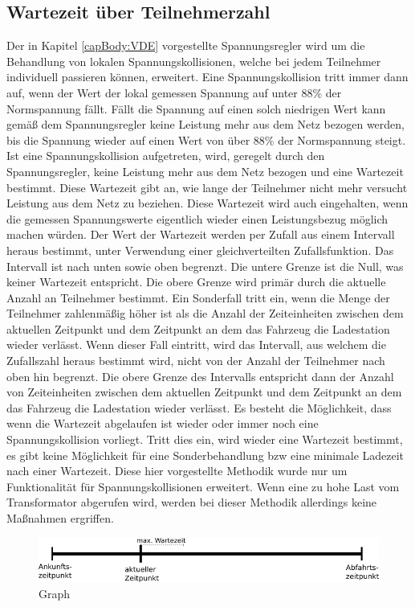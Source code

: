 \subsection{Wartezeit über Teilnehmerzahl}
\label{cap:background_sec:SA_participants}
Der in Kapitel \ref{capBody:VDE} vorgestellte Spannungsregler wird um die Behandlung von lokalen Spannungskollisionen, welche bei jedem Teilnehmer individuell passieren können, erweitert. Eine Spannungskollision tritt immer dann auf, wenn der Wert der lokal gemessen Spannung auf unter 88\% der Normspannung fällt. Fällt die Spannung auf einen solch niedrigen Wert kann gemäß dem Spannungsregler keine Leistung mehr aus dem Netz bezogen werden, bis die Spannung wieder auf einen Wert von über 88\% der Normspannung steigt. Ist eine Spannungskollision aufgetreten, wird, geregelt durch den Spannungsregler, keine Leistung mehr aus dem Netz bezogen und eine Wartezeit bestimmt. Diese Wartezeit gibt an, wie lange der Teilnehmer nicht mehr versucht Leistung aus dem Netz zu beziehen. Diese Wartezeit wird auch eingehalten, wenn die gemessen Spannungswerte eigentlich wieder einen Leistungsbezug möglich machen würden. Der Wert der Wartezeit werden per Zufall aus einem Intervall heraus bestimmt, unter Verwendung einer gleichverteilten Zufallsfunktion. Das Intervall ist nach unten sowie oben begrenzt. Die untere Grenze ist die Null, was keiner Wartezeit entspricht. Die obere Grenze wird primär durch die aktuelle Anzahl an Teilnehmer bestimmt. Ein Sonderfall tritt ein, wenn die Menge der Teilnehmer zahlenmäßig höher ist als die Anzahl der Zeiteinheiten zwischen dem aktuellen Zeitpunkt und dem Zeitpunkt an dem das Fahrzeug die Ladestation wieder verlässt. Wenn dieser Fall eintritt, wird das Intervall, aus welchem die Zufallszahl heraus bestimmt wird, nicht von der Anzahl der Teilnehmer nach oben hin begrenzt. Die obere Grenze des Intervalls entspricht dann der Anzahl von Zeiteinheiten zwischen dem aktuellen Zeitpunkt und dem Zeitpunkt an dem das Fahrzeug die Ladestation wieder verlässt. Es besteht die Möglichkeit, dass wenn die Wartezeit abgelaufen ist wieder oder immer noch eine Spannungskollision vorliegt. Tritt dies ein, wird wieder eine Wartezeit bestimmt, es gibt keine Möglichkeit für eine Sonderbehandlung bzw eine minimale Ladezeit nach einer Wartezeit. Diese hier vorgestellte Methodik wurde nur um Funktionalität für Spannungskollisionen erweitert. Wenn eine zu hohe Last vom Transformator abgerufen wird, werden bei dieser Methodik allerdings keine Maßnahmen ergriffen.
\begin{figure}[htb]
	\includegraphics[width = \linewidth]{img/SA_participants_Graph2.png}
	\caption{Graph}
	\label{SAPart:Graph}
\end{figure}

